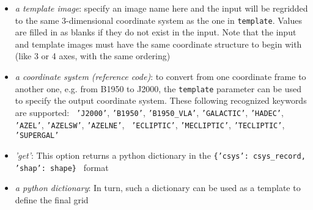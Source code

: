 \begin{itemize}
  \item {\it a template image}: specify an image name here and the
    input will be regridded to the same 3-dimensional coordinate
    system as the one in {\tt template}. Values are filled in as
    blanks if they do not exist in the input. Note that the input and
    template images must have the same coordinate structure to begin
    with (like 3 or 4 axes, with the same ordering)
  \item {\it a coordinate system (reference code)}: to convert from one coordinate
    frame to another one, e.g. from B1950 to J2000, the {\tt template}
    parameter can be used to specify the output coordinate
    system. These following recognized keywords are supported: {\tt
      'J2000'}, {\tt 'B1950'}, {\tt 'B1950\_VLA'}, {\tt 'GALACTIC'},
    {\tt 'HADEC'}, {\tt 'AZEL'}, {\tt 'AZELSW'}, {\tt 'AZELNE'}, {\tt
      'ECLIPTIC'}, {\tt 'MECLIPTIC'}, {\tt 'TECLIPTIC'}, {\tt 'SUPERGAL'}

   \item {\it 'get'}: This option returns a python dictionary in the
     {\tt \{'csys': csys\_record, 'shap': shape\}  } format

   \item {\it a python dictionary}: In turn, such a dictionary can be
     used as a template to define the final grid
\end{itemize}

  

%
%
%
%
%
